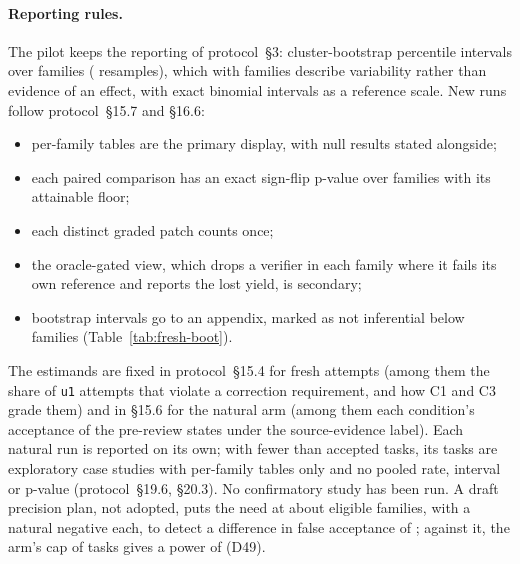 \paragraph{Reporting rules.} The pilot keeps the reporting of protocol~\S3: cluster-bootstrap percentile intervals over
families ( resamples), which with  families describe variability
rather than evidence of an effect, with exact binomial intervals as a reference scale. New runs follow protocol~\S15.7
and \S16.6:
\begin{itemize}
\item per-family tables are the primary display, with null results stated alongside;
\item each paired comparison has an exact sign-flip p-value over families with its attainable floor;
\item each distinct graded patch counts once;
\item the oracle-gated view, which drops a verifier in each family where it fails its own reference and reports the lost
  yield, is secondary;
\item bootstrap intervals go to an appendix, marked as not inferential below  families
  (Table~\ref{tab:fresh-boot}).
\end{itemize}
The estimands are fixed in protocol~\S15.4 for fresh attempts (among them the share of \texttt{u1} attempts that violate
a correction requirement, and how C1 and C3 grade them) and in \S15.6 for the natural arm (among them each condition's
acceptance of the pre-review states under the source-evidence label). Each natural run is reported on its own; with
fewer than  accepted tasks, its tasks are exploratory case studies with per-family tables
only and no pooled rate, interval or p-value (protocol~\S19.6, \S20.3). No confirmatory study has been run. A draft
precision plan, not adopted, puts the need at about  eligible families, with a natural negative
each, to detect a difference in false acceptance of ; against it, the arm's cap of
 tasks gives a power of  (D49).
